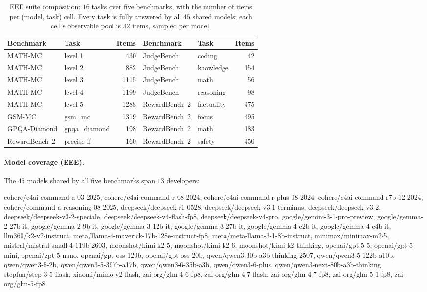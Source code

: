 \documentclass{article}
\theoremstyle{definition}
\theoremstyle{plain}
\begin{document}
\begin{table}[h]
\centering
\caption{EEE suite composition: $16$ tasks over five benchmarks, with the number of items
per (model, task) cell. Every task is fully answered by all $45$ shared models; each
cell's observable pool is $32$ items, sampled per model.}
\label{tab:eeesuite}
\footnotesize
\begin{tabular}{llr @{\hspace{2em}} llr}
\toprule
Benchmark & Task & Items & Benchmark & Task & Items \\
\midrule
MATH-MC & level 1 & 430 & JudgeBench & coding & 42 \\
MATH-MC & level 2 & 882 & JudgeBench & knowledge & 154 \\
MATH-MC & level 3 & 1115 & JudgeBench & math & 56 \\
MATH-MC & level 4 & 1199 & JudgeBench & reasoning & 98 \\
MATH-MC & level 5 & 1288 & RewardBench~2 & factuality & 475 \\
GSM-MC & gsm\_mc & 1319 & RewardBench~2 & focus & 495 \\
GPQA-Diamond & gpqa\_diamond & 198 & RewardBench~2 & math & 183 \\
RewardBench~2 & precise if & 160 & RewardBench~2 & safety & 450 \\
\bottomrule
\end{tabular}
\end{table}

\paragraph{Model coverage (EEE).} The $45$ models shared by all five benchmarks span $13$
developers:
{\footnotesize\ttfamily\raggedright cohere/c4ai-command-a-03-2025, cohere/c4ai-command-r-08-2024,
cohere/c4ai-command-r-plus-08-2024, cohere/c4ai-command-r7b-12-2024,
cohere/command-a-reasoning-08-2025, deepseek/deepseek-r1-0528,
deepseek/deepseek-v3-1-terminus, deepseek/deepseek-v3-2, deepseek/deepseek-v3-2-speciale,
deepseek/deepseek-v4-flash-fp8, deepseek/deepseek-v4-pro, google/gemini-3-1-pro-preview,
google/gemma-2-27b-it, google/gemma-2-9b-it, google/gemma-3-12b-it, google/gemma-3-27b-it,
google/gemma-4-e2b-it, google/gemma-4-e4b-it, llm360/k2-v2-instruct,
meta/llama-4-maverick-17b-128e-instruct-fp8, meta/meta-llama-3-1-8b-instruct,
minimax/minimax-m2-5, mistral/mistral-small-4-119b-2603, moonshot/kimi-k2-5,
moonshot/kimi-k2-6, moonshot/kimi-k2-thinking, openai/gpt-5-5, openai/gpt-5-mini,
openai/gpt-5-nano, openai/gpt-oss-120b, openai/gpt-oss-20b,
qwen/qwen3-30b-a3b-thinking-2507, qwen/qwen3-5-122b-a10b, qwen/qwen3-5-2b,
qwen/qwen3-5-397b-a17b, qwen/qwen3-6-35b-a3b, qwen/qwen3-6-plus,
qwen/qwen3-next-80b-a3b-thinking, stepfun/step-3-5-flash, xiaomi/mimo-v2-flash,
zai-org/glm-4-6-fp8, zai-org/glm-4-7-flash, zai-org/glm-4-7-fp8, zai-org/glm-5-1-fp8,
zai-org/glm-5-fp8.\par}
\end{document}
